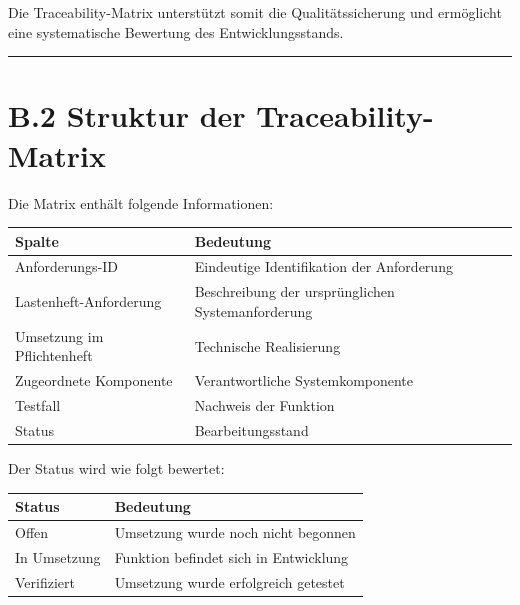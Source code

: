 \documentclass[
  a4paper,
  12pt,
  DIV=12,        %
  parskip=half,  %
  headings=small %
]{scrartcl}
\theoremstyle{definition}
\theoremstyle{definition}
\begin{document}
Die Traceability-Matrix unterstützt somit die Qualitätssicherung und
ermöglicht eine systematische Bewertung des Entwicklungsstands.

\begin{center}\rule{0.5\linewidth}{0.5pt}\end{center}

\section{B.2 Struktur der
Traceability-Matrix}\label{b.2-struktur-der-traceability-matrix}

Die Matrix enthält folgende Informationen:

\begin{longtable}[]{@{}
  >{\raggedright\arraybackslash}p{}
  >{\raggedright\arraybackslash}p{}@{}}
\toprule\noalign{}
\begin{minipage}[b]{\linewidth}\raggedright
Spalte
\end{minipage} & \begin{minipage}[b]{\linewidth}\raggedright
Bedeutung
\end{minipage} \\
\midrule\noalign{}
\endhead
\bottomrule\noalign{}
\endlastfoot
Anforderungs-ID & Eindeutige Identifikation der Anforderung \\
Lastenheft-Anforderung & Beschreibung der ursprünglichen
Systemanforderung \\
Umsetzung im Pflichtenheft & Technische Realisierung \\
Zugeordnete Komponente & Verantwortliche Systemkomponente \\
Testfall & Nachweis der Funktion \\
Status & Bearbeitungsstand \\
\end{longtable}

Der Status wird wie folgt bewertet:

\begin{longtable}[]{@{}ll@{}}
\toprule\noalign{}
Status & Bedeutung \\
\midrule\noalign{}
\endhead
\bottomrule\noalign{}
\endlastfoot
Offen & Umsetzung wurde noch nicht begonnen \\
In Umsetzung & Funktion befindet sich in Entwicklung \\
Verifiziert & Umsetzung wurde erfolgreich getestet \\
\end{longtable}
\end{document}
